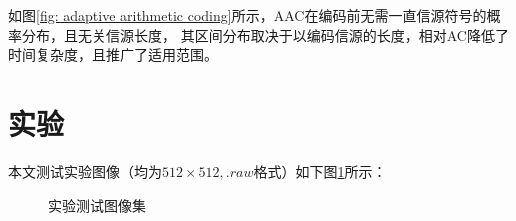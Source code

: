 \documentclass[12pt,a4paper]{article}%
\begin{document}
\vspace{-0.2em}
如图\ref{fig: adaptive arithmetic coding}所示，AAC在编码前无需一直信源符号的概率分布，且无关信源长度，
其区间分布取决于以编码信源的长度，相对AC降低了时间复杂度，且推广了适用范围。


\section{实验}
本文测试实验图像（均为$512\times 512, .raw$格式）如下图\ref{fig: img set}所示：
\vspace{-0.2em}
\begin{figure}[thb] \centering
    \vspace{-0.2em}
    \caption{实验测试图像集}
    \label{fig: img set}
\end{figure}
\end{document}
